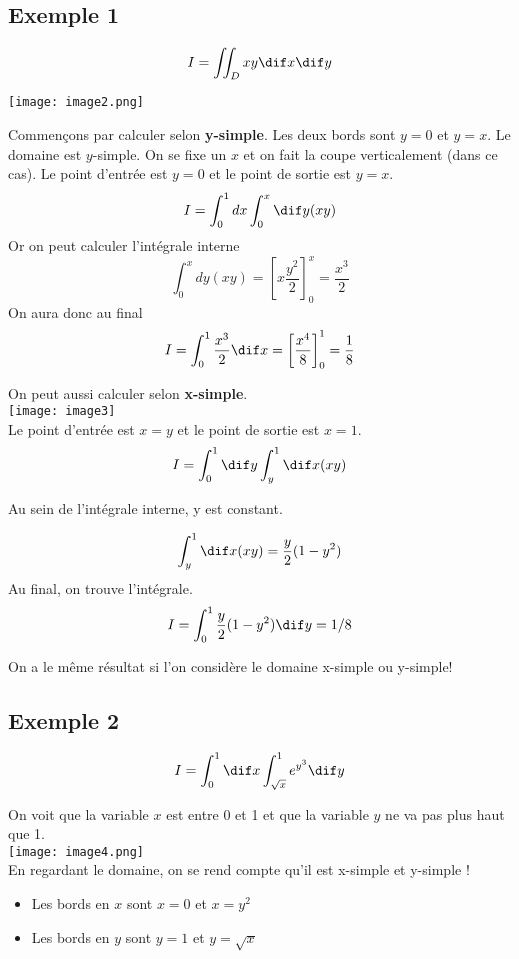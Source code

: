 \subsection{Exemple 1}
\[ I=\iint_D xy \dif x \dif y \]
\begin{center}

\texttt{[image: image2.png]}

\end{center}
Commençons par calculer selon \textbf{y-simple}.
Les deux bords sont $y=0$ et $y=x$. Le domaine est $y$-simple. On se fixe un $x$ et on fait la coupe verticalement (dans ce cas). Le point d'entrée est $y=0$ et le point de sortie est $y=x$.
\[I=\int_0^1 dx \int_0^x \dif y(xy)\]
Or on peut calculer l'intégrale interne
\[\int_0^x dy(xy) = \left[ x \frac{y^2}{2} \right]_0^x = \frac{x^3}{2}\]
On aura donc au final
\[I=\int_0^1\frac{x^3}{2} \dif x = \left[\frac{x^4}{8}\right]_0^1= \frac{1}{8}\]

On peut aussi calculer selon \textbf{x-simple}.
\\
\texttt{[image: image3]}
\\

Le point d'entrée est $x=y$ et le point de sortie est $x=1$.
\[I=\int_0^1\dif y\int_y^1\dif x(xy)\]

Au sein de l'intégrale interne, y est constant.

\[\int_y^1\dif x(xy) = \frac{y}{2}(1-y^2)\]
Au final, on trouve l'intégrale.
\[I = \int_0^1 \frac{y}{2}(1-y^2) \dif y = 1/8\]

On a le même résultat si l'on considère le domaine x-simple ou y-simple!

\subsection{Exemple 2}
\[I = \int_0^1\dif x \int_{\sqrt{x}}^1 e^{y^3} \dif y\]

On voit que la variable $x$ est entre 0 et 1 et que la variable $y$ ne va pas plus haut que 1.
\\
\texttt{[image: image4.png]}
\\

En regardant le domaine, on se rend compte qu'il est x-simple et y-simple !
\begin{itemize}

\item Les bords en $x$ sont $x=0$ et $x=y^2$
\item Les bords en $y$ sont $y=1$ et $y=\sqrt{x}$


\end{itemize}

